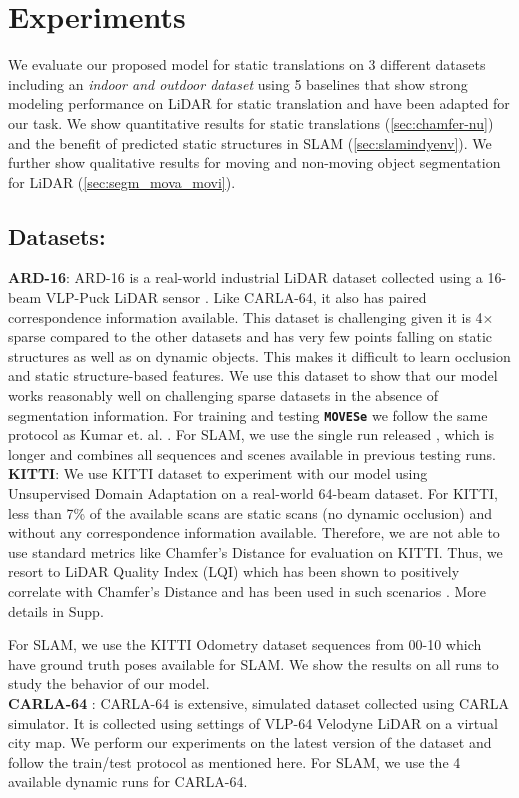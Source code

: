 \documentclass[10pt,twocolumn,letterpaper]{article}
\newcommand{\dslr}{\texttt{\textbf{MOVESe}}}
\begin{document}
\section{Experiments}
We evaluate our proposed model for static translations on 3 different datasets including an \textit{indoor and outdoor dataset} using 5 baselines that show strong modeling performance on LiDAR for static translation and have been adapted for our task. We show quantitative results for static translations (\ref{sec:chamfer-nu}) and the benefit of predicted static structures in SLAM (\ref{sec:slamindyenv}). We further show qualitative results for moving and non-moving object segmentation for LiDAR (\ref{sec:segm_mova_movi}).
\subsection{Datasets:}

\textbf{ARD-16}: ARD-16 \cite{kumar2021dslr,dslr-git} is a real-world industrial  LiDAR dataset collected using a 16-beam VLP-Puck LiDAR sensor \cite{velo16}. Like CARLA-64, it also has paired correspondence information available. This dataset is challenging given it is 4$\times$ sparse compared to the other datasets and has very few points falling on static structures as well as on dynamic objects. This makes it difficult to learn occlusion and static structure-based features. We use this dataset to show that our model works reasonably well on challenging sparse datasets in the absence of segmentation information. For training and testing \dslr{} we follow the same protocol as Kumar et. al. \cite{kumar2021dslr}. For SLAM, we use the single run released \cite{dslr-git}, which is longer and combines all sequences and scenes available in previous testing runs.\\
\textbf{KITTI}: We use KITTI dataset to experiment with our model using Unsupervised Domain Adaptation on a real-world 64-beam dataset. For KITTI, less than 7\% of the available scans are static scans (no dynamic occlusion) and without any correspondence information available. Therefore, we are not able to use standard metrics like Chamfer's Distance for evaluation on KITTI. Thus, we resort to LiDAR Quality Index (LQI) which has been shown to positively correlate with Chamfer's Distance and has been used in such scenarios \cite{kumar2021dslr}. More details in Supp. 


For SLAM, we use the KITTI Odometry dataset sequences from 00-10 which have ground truth poses available for SLAM. We show the results on all runs to study the behavior of our model.\\
 \textbf{CARLA-64} : CARLA-64 is extensive, simulated dataset collected using CARLA simulator\cite{dosovitskiy2017carla}. It is collected using settings of VLP-64 Velodyne LiDAR on a virtual city map\cite{kumar2021dslr}. We perform our experiments on the latest version of the dataset and follow the train/test protocol  as mentioned here\cite{dslr-git}. For SLAM, we use the 4 available dynamic runs for CARLA-64.
\end{document}
